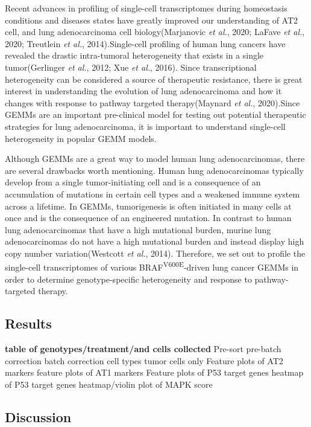 Recent advances in profiling of single-cell transcriptomes during homeostasis conditions and diseases states have greatly improved our understanding of AT2 cell, and lung adenocarcinoma cell biology(Marjanovic \emph{et al.}, 2020; LaFave \emph{et al.}, 2020; Treutlein \emph{et al.}, 2014).Single-cell profiling of human lung cancers have revealed the drastic intra-tumoral heterogeneity that exists in a single tumor(Gerlinger \emph{et al.}, 2012; Xue \emph{et al.}, 2016). Since transcriptional heterogeneity can be considered a source of therapeutic resistance, there is great interest in understanding the evolution of lung adenocarcinoma and how it changes with response to pathway targeted therapy(Maynard \emph{et al.}, 2020).Since GEMMs are an important pre-clinical model for testing out potential therapeutic strategies for lung adenocarcinoma, it is important to understand single-cell heterogeneity in popular GEMM models.

Although GEMMs are a great way to model human lung adenocarcinomas, there are several drawbacks worth mentioning. Human lung adenocarcinomas typically develop from a single tumor-initiating cell and is a consequence of an accumulation of mutations in certain cell types and a weakened immune system across a lifetime. In GEMMs, tumorigenesis is often initiated in many cells at once and is the consequence of an engineered mutation. In contrast to human lung adenocarcinomas that have a high mutational burden, murine lung adenocarcinomas do not have a high mutational burden and instead display high copy number variation(Westcott \emph{et al.}, 2014). Therefore, we set out to profile the single-cell transcriptomes of various BRAF\textsuperscript{V600E}-driven lung cancer GEMMs in order to determine genotype-specific heterogeneity and response to pathway-targeted therapy.

\hypertarget{results-2}{%
\subsection{Results}\label{results-2}}

\textbf{table of genotypes/treatment/and cells collected}
Pre-sort
pre-batch correction
batch correction
cell types
tumor cells only
Feature plots of AT2 markers
feature plots of AT1 markers
Feature plots of P53 target genes
heatmap of P53 target genes
heatmap/violin plot of MAPK score

\hypertarget{discussion-2}{%
\subsection{Discussion}\label{discussion-2}}

